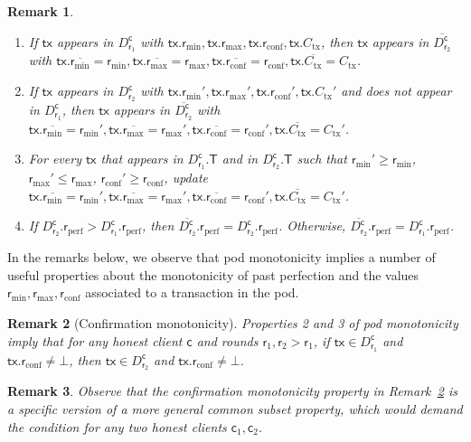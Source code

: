 \documentclass[pdflatex,sn-mathphys-num]{sn-jnl}%
\theoremstyle{thmstyleone}%
\theoremstyle{thmstyletwo}%
\newtheorem{remark}{Remark}%
\theoremstyle{thmstylethree}%
\newcommand{\podtm}{\textsf{pod}\xspace}
\newcommand{\operand}[1]{\textsf{#1}}
\newcommand{\tx}{\operand{tx}\xspace}
\newcommand{\round}{\operand{r}\xspace}
\newcommand{\client}{\operand{c}\xspace}
\newcommand{\rconf}{\ensuremath{\round_\text{conf}}\xspace}
\newcommand{\rmin}{\ensuremath{\round_\text{min}}\xspace}
\newcommand{\rmax}{\ensuremath{\round_\text{max}}\xspace}
\newcommand{\rperf}{\ensuremath{\round_\text{perf}}\xspace}
\newcommand{\txcert}{\ensuremath{C_\text{tx}}\xspace}
\newcommand{\txSet}{\operand{T}\xspace}
\newcommand{\Pod}{\ensuremath{D}\xspace}
\newcommand{\podView}[2]{\ensuremath{\Pod_{#2}^{#1}}\xspace}
\begin{document}
\begin{appendices}
\begin{remark}
    \begin{enumerate}
        \item If $\tx$ appears in $\podView{\client}{\round_1}$ with $\tx.\rmin,\tx.\rmax,\tx.\rconf,\tx.\txcert$, then $\tx$ appears in $\overline{\podView{\client}{\round_2}}$ with $\tx.\overline{\rmin}=\rmin,\tx.\overline{\rmax}=\rmax,\tx.\overline{\rconf}=\rconf,\tx.\overline{\txcert}=\txcert$.
        \item If $\tx$ appears in $\podView{\client}{\round_2}$ with $\tx.\rmin',\tx.\rmax',\tx.\rconf',\tx.\txcert'$ and does not appear in $\podView{\client}{\round_1}$, then $\tx$ appears in $\overline{\podView{\client}{\round_2}}$ with $\tx.\overline{\rmin}=\rmin',\tx.\overline{\rmax}=\rmax',\tx.\overline{\rconf}=\rconf',\tx.\overline{\txcert}=\txcert'$.
        \item For every $\tx$ that appears in $\podView{\client}{\round_1}.\txSet$ and in  $\podView{\client}{\round_2}.\txSet$ such that $\rmin'\geq \rmin$, $\rmax' \leq \rmax$, $\rconf' \geq \rconf$, update $\tx.\overline{\rmin}=\rmin',\tx.\overline{\rmax}=\rmax',\tx.\overline{\rconf}=\rconf',\tx.\overline{\txcert}=\txcert'$.
        \item If  $\podView{\client}{\round_2}.\rperf > \podView{\client}{\round_1}.\rperf$, then $\overline{\podView{\client}{\round_2}}.\rperf=\podView{\client}{\round_2}.\rperf $. Otherwise, $\overline{\podView{\client}{\round_2}}.\rperf=\podView{\client}{\round_1}.\rperf $.

    \end{enumerate}
\end{remark}

In the remarks below, we observe that \podtm monotonicity implies a number of useful properties about the monotonicity of past perfection and the values $\rmin,\rmax,\rconf$ associated to a transaction in the \podtm.

\begin{remark}[Confirmation monotonicity]\label{rem:confstick}
    Properties 2 and 3 of \podtm monotonicity imply that  for any honest client $\client$ and rounds $\round_1, \round_2 > \round_1$,
    if $\tx \in \podView{\client}{\round_1}$ and $\tx.\rconf \neq \bot$, then $\tx \in \podView{\client}{\round_2}$ and $\tx.\rconf \neq \bot$.
\end{remark}

\begin{remark}
    Observe that the \emph{confirmation monotonicity} property in Remark~\ref{rem:confstick} is a specific version of a more general \emph{common subset} property, which would demand the condition for any two honest clients $\client_1, \client_2$.
\end{remark}


\end{appendices}
\end{document}
